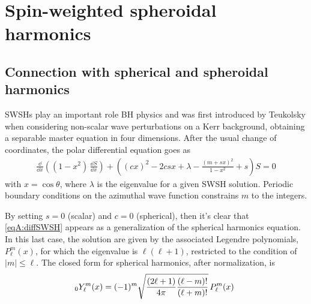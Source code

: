 
\label{AppendixA} %
\chapter{Spin-weighted spheroidal harmonics} %


\section{Connection with spherical and spheroidal harmonics}

SWSHs play an important role BH physics and was first introduced by Teukolsky when considering non-scalar wave perturbations on a Kerr background, obtaining a separable master equation in four dimensions. After the usual change of coordinates, the polar differential equation goes as 
\begin{align}
	\frac{\dd}{\dd x} \left( (1-x^2) \, \frac{\dd S}{\dd x} \right) + \left( (c x)^2 - 2 c s x + \lambda -\frac{(m + s x)^2}{1-x^2} + s \right) S = 0 
	\label{eqA:diffSWSH}
\end{align}
with $x=\cos\theta$, where $\lambda$ is the eigenvalue for a given SWSH solution. Periodic boundary conditions on the azimuthal wave function constrains $m$ to the integers.   

By setting $s=0$ (scalar) and $c=0$ (spherical), then it's clear that \eqref{eqA:diffSWSH} appears as a generalization of the spherical harmonics equation. In this last case, the solution are given by the associated Legendre polynomials, $P^m_\ell (x)$, for which the eigenvalue is $\ell(\ell+1)$, restricted to the condition of $|m| \le \ell$. The closed form for spherical harmonics, after normalization, is
\begin{align}
\sts[0]{Y^m}{\ell}(x)=(-1)^{m}{\sqrt {{(2\ell +1) \over 4\pi }{(\ell -m)! \over (\ell +m)!}}}\,P_{\ell }^{m}(x) ~
\label{eqA:SH}
\end{align}
